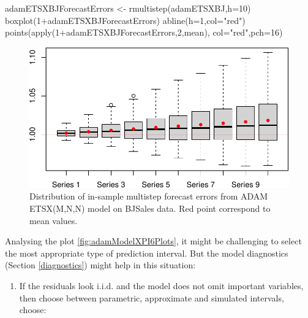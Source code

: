 \documentclass[
]{book}
\newenvironment{Shaded}{\begin{snugshade}}{\end{snugshade}}
\newcommand{\AttributeTok}[1]{\textcolor[rgb]{0.77,0.63,0.00}{#1}}
\newcommand{\DecValTok}[1]{\textcolor[rgb]{0.00,0.00,0.81}{#1}}
\newcommand{\FunctionTok}[1]{\textcolor[rgb]{0.00,0.00,0.00}{#1}}
\newcommand{\NormalTok}[1]{#1}
\newcommand{\OtherTok}[1]{\textcolor[rgb]{0.56,0.35,0.01}{#1}}
\newcommand{\SpecialCharTok}[1]{\textcolor[rgb]{0.00,0.00,0.00}{#1}}
\newcommand{\StringTok}[1]{\textcolor[rgb]{0.31,0.60,0.02}{#1}}
\providecommand{\tightlist}{%
  \setlength{\itemsep}{0pt}\setlength{\parskip}{0pt}}
\theoremstyle{definition}
\theoremstyle{definition}
\theoremstyle{definition}
\theoremstyle{definition}
\theoremstyle{remark}
\begin{document}
\begin{Shaded}
\begin{Highlighting}[]
\NormalTok{adamETSXBJForecastErrors }\OtherTok{\textless{}{-}} \FunctionTok{rmultistep}\NormalTok{(adamETSXBJ,}\AttributeTok{h=}\DecValTok{10}\NormalTok{)}
\FunctionTok{boxplot}\NormalTok{(}\DecValTok{1}\SpecialCharTok{+}\NormalTok{adamETSXBJForecastErrors)}
\FunctionTok{abline}\NormalTok{(}\AttributeTok{h=}\DecValTok{1}\NormalTok{,}\AttributeTok{col=}\StringTok{"red"}\NormalTok{)}
\FunctionTok{points}\NormalTok{(}\FunctionTok{apply}\NormalTok{(}\DecValTok{1}\SpecialCharTok{+}\NormalTok{adamETSXBJForecastErrors,}\DecValTok{2}\NormalTok{,mean),}
       \AttributeTok{col=}\StringTok{"red"}\NormalTok{,}\AttributeTok{pch=}\DecValTok{16}\NormalTok{)}
\end{Highlighting}
\end{Shaded}

\begin{figure}
\centering
\includegraphics{Svetunkov--2022----ADAM_files/figure-latex/adamModelXForecastErrors-1.pdf}
\caption{\label{fig:adamModelXForecastErrors}Distribution of in-sample multistep forecast errors from ADAM ETSX(M,N,N) model on BJSales data. Red point correspond to mean values.}
\end{figure}

Analysing the plot \ref{fig:adamModelXPI6Plots}, it might be challenging to select the most appropriate type of prediction interval. But the model diagnostics (Section \ref{diagnostics}) might help in this situation:

\begin{enumerate}
\def\labelenumi{\arabic{enumi}.}
\tightlist
\item
  If the residuals look i.i.d. and the model does not omit important variables, then choose between parametric, approximate and simulated intervals, choose:
\end{enumerate}
\end{document}
